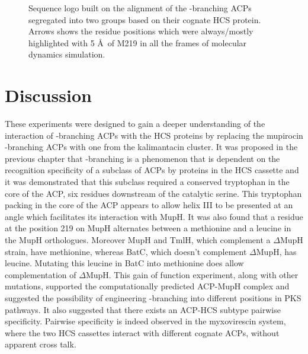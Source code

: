 		\setlength\fboxsep{5pt}
		\setlength\fboxrule{1.5pt}
		\begin{figure}[htbp]
		\centering
		\caption[Sequence logo built on the alignment of the \bet-branching ACPs segregated into two groups based on their cognate HCS protein.]{Sequence logo built on the alignment of the \bet-branching ACPs segregated into two groups based on their cognate HCS protein. Arrows shows the residue positions which were always/mostly highlighted with 5 \AA \ of M219 in all the frames of molecular dynamics simulation.}
		\label{fig:lmlogo}
		\end{figure}		

\newpage

\section{Discussion}
\label{sec:chap4discussion}
These experiments were designed to gain a deeper understanding of the interaction of \bet-branching ACPs with the HCS proteins by replacing the mupirocin \bet-branching ACPs with one from the kalimantacin cluster. It was proposed in the previous chapter that \bet-branching is a phenomenon that is dependent on the recognition specificity of a subclass of ACPs by proteins in the HCS cassette and it was demonstrated that this subclass required a conserved tryptophan in the core of the ACP, six residues downstream of the catalytic serine. This tryptophan packing in the core of the ACP appears to allow helix III to be presented at an angle which facilitates its interaction with MupH. It was also found that a residue at the position 219 on MupH alternates between a methionine and a leucine in the MupH orthologues. Moreover MupH and TmlH, which complement a $ \Delta $MupH strain, have methionine, whereas BatC, which doesn't complement $ \Delta $MupH, has leucine. Mutating this leucine in BatC into methionine does allow complementation of $ \Delta $MupH. This gain of function experiment, along with other mutations, supported the computationally predicted ACP-MupH complex and suggested the possibility of engineering \bet-branching into different positions in PKS pathways. It also suggested that there exists an ACP-HCS subtype pairwise specificity. Pairwise specificity is indeed observed in the myxovirescin system, where the two HCS cassettes interact with different cognate ACPs,  without apparent cross talk.

